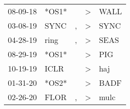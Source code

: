 \begin{supertabular}{p{0.07\textwidth}p{0.06\textwidth}p{0.02\textwidth}p{0.02\textwidth}p{0.06\textwidth}}
 08-09-18\textsuperscript{} &                   *OS1* &               &     \textgreater &           WALL\textsuperscript{} \\
 03-08-19\textsuperscript{} &  SYNC\textsuperscript{} &             , &     \textgreater &           SYNC\textsuperscript{} \\
 04-28-19\textsuperscript{} &  ring\textsuperscript{} &             , &     \textgreater &           SEAS\textsuperscript{} \\
 08-29-19\textsuperscript{} &                   *OS1* &               &     \textgreater &            PIG\textsuperscript{} \\
 10-19-19\textsuperscript{} &  ICLR\textsuperscript{} &               &     \textgreater &            haj\textsuperscript{} \\
 01-31-20\textsuperscript{} &                   *OS2* &               &     \textgreater &           BADF\textsuperscript{} \\
 02-26-20\textsuperscript{} &  FLOR\textsuperscript{} &             , &     \textgreater &           mulc\textsuperscript{} \\
\end{supertabular}
